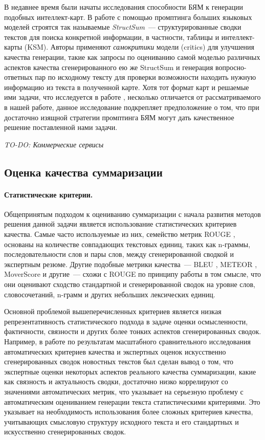 \documentclass[12pt]{article}
\begin{document}
В недавнее время были начаты исследования способности БЯМ к генерации подобных интеллект-карт. В работе \cite{jain2024structsum} с помощью промптинга больших языковых моделей строятся так называемые \emph{StructSum}~--- структурированные сводки текстов для поиска конкретной информации, в частности, таблицы и интеллект-карты (KSM). Авторы применяют \textit{самокритики} модели (critics) для улучшения качества генерации, такие как запросы по оцениванию самой моделью различных аспектов качества сгенерированного ею же StructSum и генерация вопросно-ответных пар по исходному тексту для проверки возможности находить нужную информацию из текста в полученной карте. Хотя тот формат карт и решаемые ими задачи, что исследуется в работе \cite{jain2024structsum}, несколько отличается от рассматриваемого в нашей работе, данное исследование подкрепляет предположение о том, что при достаточно изящной стратегии промптинга БЯМ могут дать качественное решение поставленной нами задачи.

\textit{TO-DO: Коммерческие сервисы}

\subsection{Оценка качества суммаризации}
\paragraph{Статистические критерии.} Общепринятым подходом к оцениванию суммаризации с начала развития методов решения данной задачи является использование статистических критериев качества. Самые часто используемые из них, семейство метрик ROUGE \cite{lin2004rouge}, основаны на количестве совпадающих текстовых единиц, таких как n-граммы, последовательности слов и пары слов, между сгенерированной сводкой и экспертным резюме. Другие подобные метрики качества~--- BLEU \cite{papineni2002bleu}, METEOR \cite{banerjee2005meteor}, MoverScore \cite{zhao2019moverscore} и другие~--- схожи с ROUGE по принципу работы в том смысле, что они оценивают сходство стандартной и сгенерированной сводок на уровне слов, словосочетаний, n-грамм и других небольших лексических единиц. 

Основной проблемой вышеперечисленных критериев является низкая репрезентативность статистического подхода в задаче оценки осмысленности, фактичности, связности и других более тонких аспектов сгенерированных сводок. Например, в работе \cite{fabbri2021summeval} по результатам масштабного сравнительного исследования автоматических критериев качества и экспертных оценок искусственно сгенерированных сводок новостных текстов был сделан вывод о том, что экспертные оценки некоторых аспектов реального качества суммаризации, какие как связность и актуальность сводки, достаточно низко коррелируют со значениями автоматических метрик, что указывает на серьезную проблему с автоматическим оцениванием генерации текста статистическими критериями. Это указывает на необходимость использования более сложных критериев качества, учитывающих смысловую структуру исходного текста и его стандартных и искусственно сгенерированных сводок.
\end{document}
